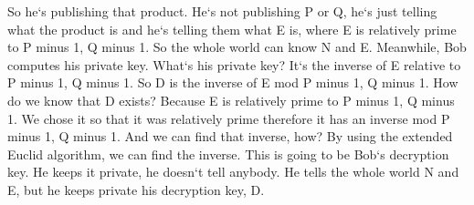 So he`s publishing that product.
He`s not publishing P or Q, he`s just telling what the product is and he`s telling them what E is, where E is relatively prime to P minus 1, Q minus 1.
So the whole world can know N and E\@.
Meanwhile, Bob computes his private key.
What`s his private key? It`s the inverse of E relative to P minus 1, Q minus 1.
So D is the inverse of E mod P minus 1, Q minus 1.
How do we know that D exists? Because E is relatively prime to P minus 1, Q minus 1.
We chose it so that it was relatively prime therefore it has an inverse mod P minus 1, Q minus 1.
And we can find that inverse, how? By using the extended Euclid algorithm, we can find the inverse.
This is going to be Bob`s decryption key.
He keeps it private, he doesn`t tell anybody.
He tells the whole world N and E, but he keeps private his decryption key, D\@.

